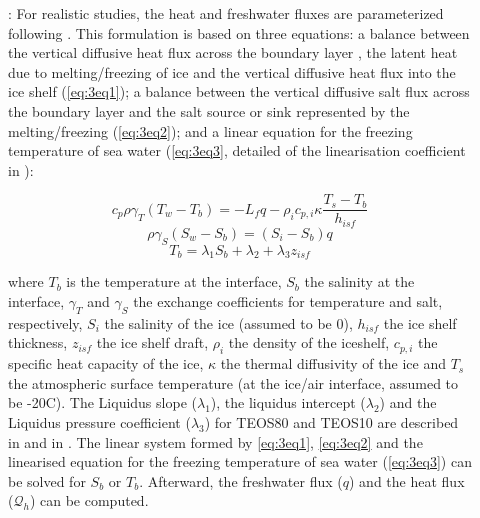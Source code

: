 \documentclass[../main/NEMO_manual]{subfiles}
\begin{document}
\begin{description}
        \item[]:
        For realistic studies, the heat and freshwater fluxes are parameterized following \citep{Jenkins2001}. This formulation is based on three equations: 
        a balance between the vertical diffusive heat flux across the boundary layer 
        , the latent heat due to melting/freezing of ice and the vertical diffusive heat flux into the ice shelf (\autoref{eq:3eq1}); 
        a balance between the vertical diffusive salt flux across the boundary layer and the salt source or sink represented by the melting/freezing (\autoref{eq:3eq2}); 
        and a linear equation for the freezing temperature of sea water (\autoref{eq:3eq3}, detailed of the linearisation coefficient in \citet{AsayDavis2016}):

        \begin{equation}
        \label{eq:3eq1}
        c_p \rho \gamma_T (T_w-T_b) = -L_f q - \rho_i c_{p,i} \kappa \frac{T_s - T_b}{h_{isf}}
        \end{equation}
        \begin{equation}
        \label{eq:3eq2}
        \rho \gamma_S (S_w - S_b) = (S_i - S_b)q
        \end{equation}
        \begin{equation}
        \label{eq:3eq3}
        T_b = \lambda_1 S_b + \lambda_2 +\lambda_3 z_{isf}
        \end{equation}

        where $T_b$ is the temperature at the interface, $S_b$ the salinity at the interface, $\gamma_T$ and $\gamma_S$ the exchange coefficients for temperature and salt, respectively, 
        $S_i$ the salinity of the ice (assumed to be 0), $h_{isf}$ the ice shelf thickness, $z_{isf}$ the ice shelf draft, $\rho_i$ the density of the iceshelf, 
        $c_{p,i}$ the specific heat capacity of the ice, $\kappa$ the thermal diffusivity of the ice 
        and $T_s$ the atmospheric surface temperature (at the ice/air interface, assumed to be -20C). 
        The Liquidus slope ($\lambda_1$), the liquidus intercept ($\lambda_2$) and the Liquidus pressure coefficient ($\lambda_3$) 
        for TEOS80 and TEOS10 are described in \citep{AsayDavis2016} and in \citep{Jourdain2017}.
        The linear system formed by \autoref{eq:3eq1}, \autoref{eq:3eq2} and the linearised equation for the freezing temperature of sea water (\autoref{eq:3eq3}) can be solved for $S_b$ or $T_b$. 
        Afterward, the freshwater flux ($q$) and the heat flux ($\mathcal{Q}_h$) can be computed.

     \end{description}
\end{document}

